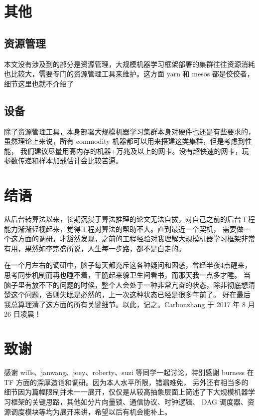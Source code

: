 \section{其他}\label{sec:other}

\subsection{资源管理}\label{subsec:resource-management}

本文没有涉及到的部分是资源管理，大规模机器学习框架部署的集群往往资源消耗也比较大，需要专门的资源管理工具来维护。这方面 yarn 和 mesos 都是佼佼者，
细节这里也就不介绍了

\subsection{设备}\label{subsec:devices}

除了资源管理工具，本身部署大规模机器学习集群本身对硬件也还是有些要求的，虽然理论上来说，所有 commodity 机器都可以用来搭建这类集群，但是考虑到性能，
我们建议尽量用高内存的机器+万兆及以上的网卡。没有超快速的网卡，玩参数传递和样本加载估计会比较苦逼。


\section{结语}\label{sec:another}

从后台转算法以来，长期沉浸于算法推理的论文无法自拔，对自己之前的后台工程能力渐渐轻视起来，觉得工程对算法的帮助不大。直到最近一个契机，
需要做一个这方面的调研，才豁然发现，之前的工程经验对我理解大规模机器学习框架非常有用，果然如李宗盛所说，人生每一步路，都不是白走的。

在一个月左右的调研中，脑子每天都充斥这各种疑问和困惑，曾经半夜4点醒来，思考同步机制而再也睡不着，干脆起来躲卫生间看书，而那天我一点多才睡。
当脑子里有放不下的问题的时候，整个人会处于一种非常亢奋的状态，除非彻底想清楚这个问题，否则失眠是必然的，上一次这种状态已经是很多年前了。
好在最后我总算理清了这方面的所有关键细节。以此，记之。Carbonzhang 于 2017 年 8 月 26 日凌晨！


\section*{致谢}

感谢 wills、janwang、joey、roberty、suzi 等同学一起讨论，特别感谢 burness 在 TF 方面的深厚造诣和调研。因为本人水平所限，错漏难免，
另外还有相当多的细节因为篇幅限制并未一一展开，仅仅是从较高抽象层面上简述了下大规模机器学习框架的关键思路，其他如分片向量锁、通信协议、时钟逻辑、
DAG 调度器、资源调度模块等均为展开来讲，希望以后有机会能补上。

\endinput
